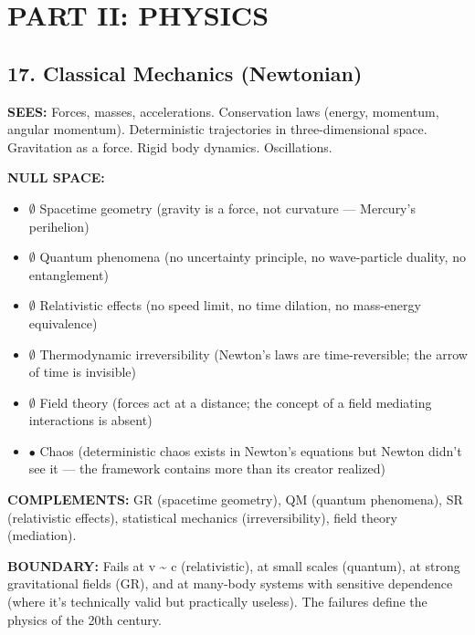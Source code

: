 \bigskip\noindent\makebox[\textwidth]{\color{rulegray}\rule{5cm}{0.3pt}}\bigskip


\section*{PART II: PHYSICS}


\subsection*{17. Classical Mechanics (Newtonian)}


\textbf{SEES:} Forces, masses, accelerations. Conservation laws (energy, momentum, angular momentum). Deterministic trajectories in three-dimensional space. Gravitation as a force. Rigid body dynamics. Oscillations.


\textbf{NULL SPACE:}

\begin{itemize}[nosep,leftmargin=*]
  \item $\emptyset$ Spacetime geometry (gravity is a force, not curvature — Mercury's perihelion)
  \item $\emptyset$ Quantum phenomena (no uncertainty principle, no wave-particle duality, no entanglement)
  \item $\emptyset$ Relativistic effects (no speed limit, no time dilation, no mass-energy equivalence)
  \item $\emptyset$ Thermodynamic irreversibility (Newton's laws are time-reversible; the arrow of time is invisible)
  \item $\emptyset$ Field theory (forces act at a distance; the concept of a field mediating interactions is absent)
  \item $\bullet$ Chaos (deterministic chaos exists in Newton's equations but Newton didn't see it — the framework contains more than its creator realized)
\end{itemize}


\textbf{COMPLEMENTS:} GR (spacetime geometry), QM (quantum phenomena), SR (relativistic effects), statistical mechanics (irreversibility), field theory (mediation).


\textbf{BOUNDARY:} Fails at v \textasciitilde{} c (relativistic), at small scales (quantum), at strong gravitational fields (GR), and at many-body systems with sensitive dependence (where it's technically valid but practically useless). The failures define the physics of the 20th century.


